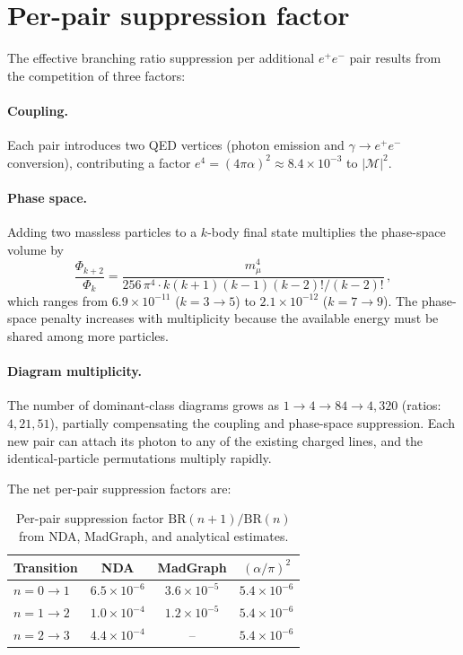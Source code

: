 \documentclass[11pt,a4paper]{article}
\begin{document}
\section{Per-pair suppression factor}
\label{sec:suppression}

The effective branching ratio suppression per additional $e^+e^-$ pair
results from the competition of three factors:

\paragraph{Coupling.}
Each pair introduces two QED vertices (photon emission and
$\gamma \to e^+e^-$ conversion), contributing a factor
$e^4 = (4\pi\alpha)^2 \approx 8.4\times10^{-3}$
to $|\mathcal{M}|^2$.

\paragraph{Phase space.}
Adding two massless particles to a $k$-body final state multiplies
the phase-space volume by
\begin{equation}
\frac{\Phi_{k+2}}{\Phi_k}
= \frac{m_\mu^4}{256\,\pi^4 \cdot k(k\!+\!1)(k\!-\!1)(k\!-\!2)!/(k\!-\!2)!}\,,
\label{eq:phi_ratio}
\end{equation}
which ranges from $6.9\times10^{-11}$
($k = 3 \to 5$) to $2.1\times10^{-12}$ ($k = 7 \to 9$).
The phase-space penalty increases with multiplicity because the
available energy must be shared among more particles.

\paragraph{Diagram multiplicity.}
The number of dominant-class diagrams grows as
$1 \to 4 \to 84 \to 4{,}320$ (ratios: $4, 21, 51$), partially
compensating the coupling and phase-space suppression.
Each new pair can attach its photon to any of the existing charged
lines, and the identical-particle permutations multiply rapidly.

\medskip
The net per-pair suppression factors are:

\begin{table}[h]
\centering
\caption{Per-pair suppression factor
$\text{BR}(n\!+\!1)/\text{BR}(n)$ from NDA, MadGraph, and analytical
estimates.}
\label{tab:suppression}
\begin{tabular}{lccc}
\toprule
Transition & NDA & MadGraph & $(\alpha/\pi)^2$ \\
\midrule
$n\!=\!0 \to 1$ & $6.5\times10^{-6}$ & $3.6\times10^{-5}$ & $5.4\times10^{-6}$ \\
$n\!=\!1 \to 2$ & $1.0\times10^{-4}$ & $1.2\times10^{-5}$ & $5.4\times10^{-6}$ \\
$n\!=\!2 \to 3$ & $4.4\times10^{-4}$ & -- & $5.4\times10^{-6}$ \\
\bottomrule
\end{tabular}
\end{table}
\end{document}

